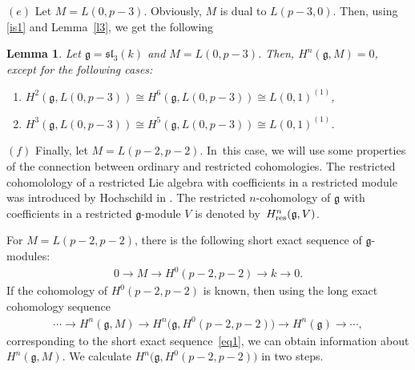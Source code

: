 \documentclass[10pt,a4paper]{amsart}
\numberwithin{equation}{section}
\newtheorem{Lemma}[Theorem]{Lemma}
\begin{document}
$(e)$ Let $M=L(0,p-3)$. Obviously, $M$ is dual to $L(p-3,0)$. Then, using \eqref{is1} and Lemma~\ref{l3}, we get the following

\begin{Lemma}\label{l4}
Let $\mathfrak{g}=\mathfrak{sl}_3(k)$ and $M=L(0,p-3)$. Then, $H^n(\mathfrak{g},M)=0$, except for the following cases:
\begin{enumerate}\itemsep=0pt

\item[$(i)$] $H^2(\mathfrak{g},L(0,p-3))\cong H^6(\mathfrak{g},L(0,p-3))\cong L(0,1)^{(1)}$,

\item[$(ii)$] $H^3(\mathfrak{g},L(0,p-3))\cong H^5(\mathfrak{g},L(0,p-3))\cong L(0,1)^{(1)}$.
\end{enumerate}
\end{Lemma}

$(f)$ Finally, let $M=L(p-2,p-2)$. In~this case, we will use some properties of the connection between ordinary and restricted cohomologies. The restricted cohomolology of a restricted Lie algebra with coefficients in a restricted module was introduced by Hochschild in \cite[p.~561]{Hoch54}. The restricted $n$-cohomology of $\mathfrak{g}$ with coefficients in a restricted $\mathfrak{g}$-module $V$ is denoted by~$H^n_{\rm res}(\mathfrak{g},V)$.

For $M=L(p-2,p-2)$, there is the following short exact sequence of $\mathfrak{g}$-modules:
\begin{gather}
0\longrightarrow M\longrightarrow H^0(p-2,p-2)\longrightarrow k\longrightarrow 0.
\label{eq1}
\end{gather}
If the cohomology of $H^0(p-2,p-2)$ is known, then using the long exact cohomology sequence
\begin{gather}
\cdots\longrightarrow H^n(\mathfrak{g},M)\longrightarrow H^n\big(\mathfrak{g},H^0(p-2,p-2)\big)\longrightarrow H^n(\mathfrak{g})\longrightarrow \cdots,\label{eq12}
\end{gather}
corresponding to the short exact sequence~\eqref{eq1}, we can obtain information about $H^{n}(\mathfrak{g},M)$.
We calculate $H^n\big(\mathfrak{g},H^0(p-2,p-2)\big)$ in two steps.
\end{document}
